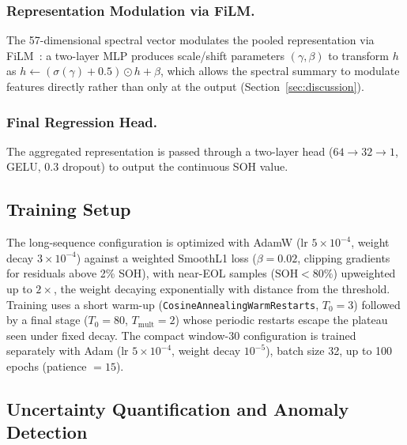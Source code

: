 \subsubsection{Representation Modulation via FiLM.}
The 57-dimensional spectral vector modulates the pooled representation via
FiLM~\cite{perez2018}: a two-layer MLP produces scale/shift parameters
$(\gamma, \beta)$ to transform $h$ as
$h \leftarrow (\sigma(\gamma) + 0.5)\odot h + \beta$, which allows the spectral
summary to modulate features directly rather than only at the output
(Section~\ref{sec:discussion}).

\subsubsection{Final Regression Head.}
The aggregated representation is passed through a two-layer head
($64 \rightarrow 32 \rightarrow 1$, GELU, 0.3 dropout) to output the continuous
SOH value.

\subsection{Training Setup}
\label{subsec:training}

The long-sequence configuration is optimized with AdamW (lr $5\times10^{-4}$,
weight decay $3\times10^{-4}$) against a weighted SmoothL1 loss
($\beta = 0.02$, clipping gradients for residuals above 2\% SOH), with near-EOL
samples ($\mathrm{SOH} < 80\%$) upweighted up to $2\times$, the weight decaying
exponentially with distance from the threshold. Training uses a short warm-up
(\texttt{CosineAnnealingWarmRestarts}, $T_{0} = 3$) followed by a final stage
($T_{0} = 80$, $T_{\mathrm{mult}} = 2$) whose periodic restarts escape the
plateau seen under fixed decay. The compact window-30 configuration is trained
separately with Adam (lr $5\times10^{-4}$, weight decay $10^{-5}$), batch size
32, up to 100 epochs (patience $= 15$).

\subsection{Uncertainty Quantification and Anomaly Detection}
\label{subsec:uncertainty}

